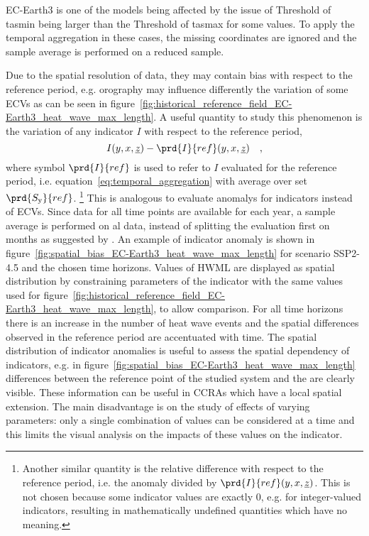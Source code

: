 EC-Earth3 is one of the models being affected by the issue of {Threshold of \gls{tasmin}} being larger than the {Threshold of \gls{tasmax}} for some values. To apply the temporal aggregation in these cases, the missing coordinates are ignored and the sample average is performed on a reduced sample.

Due to the spatial resolution of data, they may contain bias with respect to the reference period, e.g. orography may influence differently the variation of some \glspl{ECV} as can be seen in figure~\ref{fig:historical_reference_field_EC-Earth3_heat_wave_max_length}.
A useful quantity to study this phenomenon is the variation of any \gls{indicator} $I$ with respect to the reference period,
\begin{equation}
  \label{eq:spatial_bias}
  I(y, x, \underline{z}) - \prd{I}{ref}(y, x, \underline{z})
  \quad ,
\end{equation}
where symbol $\prd{I}{ref}$ is used to refer to $I$ evaluated for the reference period, i.e. equation~\eqref{eq:temporal_aggregation} with average over set $\prd{S_\text{y}}{ref}$.%
\footnote{Another similar quantity is the relative difference with respect to the reference period, i.e. the anomaly divided by $\prd{I}{ref}(y, x, \underline{z})$. This is not chosen because some indicator values are exactly 0, e.g. for integer-valued indicators, resulting in mathematically undefined quantities which have no meaning.}
This is analogous to evaluate \glspl{anomaly} for indicators instead of \glspl{ECV}. Since data for all time points are available for each year, a sample average is performed on al data, instead of splitting the evaluation first on months as suggested by \cite[6]{2017WorldMeteorologicalOrganizationWMOWMOGuidelines}.
An example of indicator anomaly is shown in figure~\ref{fig:spatial_bias_EC-Earth3_heat_wave_max_length} for scenario SSP2-4.5 and the chosen time horizons. Values of $\mathrm{HWML}$ are displayed as spatial distribution by constraining parameters of the indicator with the same values used for figure~\ref{fig:historical_reference_field_EC-Earth3_heat_wave_max_length}, to allow comparison. For all time horizons there is an increase in the number of heat wave events and the spatial differences observed in the reference period are accentuated with time. The spatial distribution of indicator anomalies is useful to assess the spatial dependency of indicators, e.g. in figure~\ref{fig:spatial_bias_EC-Earth3_heat_wave_max_length} differences between the reference point of the studied system and the are clearly visible. These information can be useful in \glspl{CCRA} which have a local spatial extension. The main disadvantage is on the study of effects of varying parameters: only a single combination of values can be considered at a time and this limits the visual analysis on the impacts of these values on the indicator.

